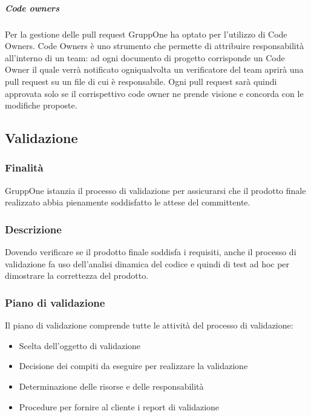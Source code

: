 \documentclass[../norme-di-progetto.tex]{subfiles}
\begin{document}
\subparagraph{Code owners}%
\label{subp:code_owners}

Per la gestione delle pull request GruppOne ha optato per l'utilizzo di Code Owners. Code Owners è uno strumento che permette di attribuire responsabilità all'interno di un team: ad ogni documento di progetto corrisponde un Code Owner il quale verrà notificato ogniqualvolta un verificatore del team aprirà una pull request su un file di cui è responsabile. Ogni pull request sarà quindi approvata solo se il corrispettivo code owner ne prende visione e concorda con le modifiche proposte.

\subsection{Validazione}%
\label{sub:validazione}

\subsubsection{Finalità}%
\label{subs:validazione/finalita}

GruppOne istanzia il processo di validazione per assicurarsi che il prodotto finale realizzato abbia pienamente soddisfatto le attese del committente.

\subsubsection{Descrizione}%
\label{subs:validazione/descrizione}

Dovendo verificare se il prodotto finale soddisfa i requisiti, anche il processo di validazione fa uso dell'analisi dinamica del codice e quindi di test ad hoc per dimostrare la correttezza del prodotto.

\subsubsection{Piano di validazione}%
\label{subs:piano_di_validazione}

Il piano di validazione comprende tutte le attività del processo di validazione:

\begin{itemize}
  \item Scelta dell'oggetto di validazione
  \item Decisione dei compiti da eseguire per realizzare la validazione
  \item Determinazione delle risorse e delle responsabilità
  \item Procedure per fornire al cliente i report di validazione
\end{itemize}
\end{document}
